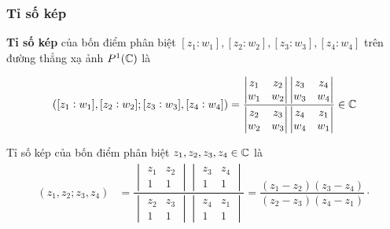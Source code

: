 \subsubsection{Tỉ số kép}
\begin{defn}[Tỉ số kép]
    \textbf{Tỉ số kép} của bốn điểm phân biệt $[z_1:w_1],[z_2:w_2],[z_3:w_3],[z_4:w_4]$ trên đường thẳng xạ ảnh $P^1(\mathbb{C})$ là 

    \[([z_1:w_1],[z_2:w_2];[z_3:w_3],[z_4:w_4]) = \dfrac{\begin{vmatrix}
         z_1 & z_2\\
         w_1 & w_2
    \end{vmatrix}\begin{vmatrix}
         z_3 & z_4\\
         w_3 & w_4
    \end{vmatrix}}{\begin{vmatrix}
         z_2 & z_3\\
         w_2 & w_3
    \end{vmatrix}\begin{vmatrix}
         z_4 & z_1\\
         w_4 & w_1
    \end{vmatrix}}\in \mathbb{C}\]
\end{defn}
\begin{exam*}
    Tỉ số kép của bốn điểm phân biệt $z_1,z_2,z_3,z_4 \in \mathbb{C}$ là 
    \begin{align*}
        (z_1,z_2;z_3,z_4) &= \dfrac{\begin{vmatrix}
         z_1 & z_2\\
         1 & 1
    \end{vmatrix}\begin{vmatrix}
         z_3 & z_4\\
         1 & 1
    \end{vmatrix}}{\begin{vmatrix}
         z_2 & z_3\\
         1 & 1
    \end{vmatrix}\begin{vmatrix}
         z_4 & z_1\\
         1 & 1
    \end{vmatrix}}
    = \dfrac{(z_1-z_2)(z_3-z_4)}{(z_2-z_3)(z_4-z_1)}\cdot
    \end{align*}
\end{exam*}
